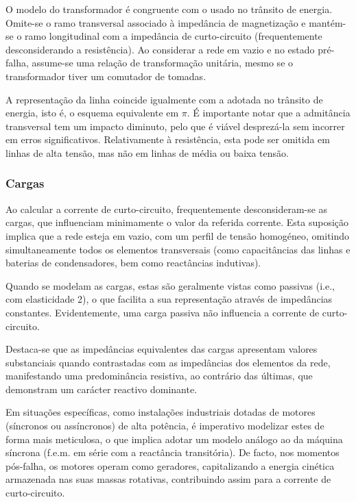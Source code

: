 O modelo do transformador é congruente com o usado no trânsito de energia. Omite-se o ramo transversal associado à impedância de magnetização e mantém-se o ramo longitudinal com a impedância de curto-circuito (frequentemente desconsiderando a resistência). Ao considerar a rede em vazio e no estado pré-falha, assume-se uma relação de transformação unitária, mesmo se o transformador tiver um comutador de tomadas.

A representação da linha coincide igualmente com a adotada no trânsito de energia, isto é, o esquema equivalente em $\pi$. É importante notar que a admitância transversal tem um impacto diminuto, pelo que é viável desprezá-la sem incorrer em erros significativos. Relativamente à resistência, esta pode ser omitida em linhas de alta tensão, mas não em linhas de média ou baixa tensão.

\subsubsection{Cargas}

Ao calcular a corrente de curto-circuito, frequentemente desconsideram-se as cargas, que influenciam minimamente o valor da referida corrente. Esta suposição implica que a rede esteja em vazio, com um perfil de tensão homogéneo, omitindo simultaneamente todos os elementos transversais (como capacitâncias das linhas e baterias de condensadores, bem como reactâncias indutivas).

Quando se modelam as cargas, estas são geralmente vistas como passivas (i.e., com elasticidade 2), o que facilita a sua representação através de impedâncias constantes. Evidentemente, uma carga passiva não influencia a corrente de curto-circuito.

Destaca-se que as impedâncias equivalentes das cargas apresentam valores substanciais quando contrastadas com as impedâncias dos elementos da rede, manifestando uma predominância resistiva, ao contrário das últimas, que demonstram um carácter reactivo dominante.

Em situações específicas, como instalações industriais dotadas de motores (síncronos ou assíncronos) de alta potência, é imperativo modelizar estes de forma mais meticulosa, o que implica adotar um modelo análogo ao da máquina síncrona (f.e.m. em série com a reactância transitória). De facto, nos momentos pós-falha, os motores operam como geradores, capitalizando a energia cinética armazenada nas suas massas rotativas, contribuindo assim para a corrente de curto-circuito.

